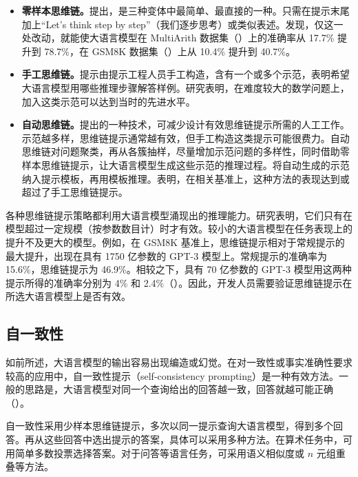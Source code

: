 \begin{itemize}
\item \textbf{零样本思维链。}提出，是三种变体中最简单、最直接的一种。只需在提示末尾加上“Let's think step by step”（我们逐步思考）或类似表述。发现，仅这一处改动，就能使大语言模型在 MultiArith 数据集（）上的准确率从 17.7\% 提升到 78.7\%，在 GSM8K 数据集（）上从 10.4\% 提升到 40.7\%。
\item \textbf{手工思维链。}提示由提示工程人员手工构造，含有一个或多个示范，表明希望大语言模型用哪些推理步骤解答样例。研究表明，在难度较大的数学问题上，加入这类示范可以达到当时的先进水平。
\item \textbf{自动思维链。}提出的一种技术，可减少设计有效思维链提示所需的人工工作。示范越多样，思维链提示通常越有效，但手工构造这类提示可能很费力。自动思维链对问题聚类，再从各簇抽样，尽量增加示范问题的多样性，同时借助零样本思维链提示，让大语言模型生成这些示范的推理过程。将自动生成的示范纳入提示模板，再用模板推理。表明，在相关基准上，这种方法的表现达到或超过了手工思维链提示。
\end{itemize}

\begin{practicaltip}
各种思维链提示策略都利用大语言模型涌现出的推理能力。研究表明，它们只有在模型超过一定规模（按参数数目计）时才有效。较小的大语言模型在任务表现上的提升不及更大的模型。例如，在 GSM8K 基准上，思维链提示相对于常规提示的最大提升，出现在具有 1750 亿参数的 GPT-3 模型上。常规提示的准确率为 15.6\%，思维链提示为 46.9\%。相较之下，具有 70 亿参数的 GPT-3 模型用这两种提示所得的准确率分别为 4\% 和 2.4\%（）。因此，开发人员需要验证思维链提示在所选大语言模型上是否有效。
\end{practicaltip}

\subsection{自一致性}
如前所述，大语言模型的输出容易出现编造或幻觉。在对一致性或事实准确性要求较高的应用中，自一致性提示（self-consistency prompting）是一种有效方法。一般的思路是，大语言模型对同一个查询给出的回答越一致，回答就越可能正确（）。

自一致性采用少样本思维链提示，多次以同一提示查询大语言模型，得到多个回答。再从这些回答中选出提示的答案，具体可以采用多种方法。在算术任务中，可用简单多数投票选择答案。对于问答等语言任务，可采用语义相似度或 $n$ 元组重叠等方法。

